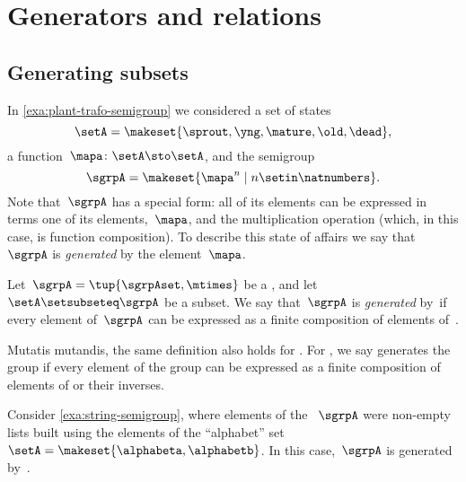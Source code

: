 
\section{Generators and relations}


\subsection{Generating subsets}

In \cref{exa:plant-trafo-semigroup} we considered a set of states
%
\begin{equation}
    \setA= \makeset{ \sprout, \yng, \mature, \old, \dead },
\end{equation}
%
a function~$\mapa \colon \setA \sto \setA$, and the semigroup
%
\begin{equation}
    \label{eq:trafo-sgrp-one-gen}
    \sgrpA = \makeset{ \mapa^n \mid n \setin \natnumbers }.
\end{equation}
%
Note that~$\sgrpA$ has a special form: all of its elements can be expressed in terms one of its elements,~$\mapa$, and the multiplication operation (which, in this case, is function composition).
To describe this state of affairs we say that~$\sgrpA$ is \emph{generated} by the element~$\mapa$.

\begin{ctdefinition}
    \label{def:gen-semigrp}
    Let~$\sgrpA = \tup{\sgrpAset, \mtimes}$ be a  , and let~$\setA \setsubseteq \sgrpA$ be a subset.
    We say that~$\sgrpA$ is \emph{generated} by~\setA if every element of~$\sgrpA$ can be expressed as a finite composition of elements of~\setA.
\end{ctdefinition}

\begin{remark}
    Mutatis mutandis, the same definition also holds for .
    For , we say \setA generates the group if every element of the group can be expressed as a finite composition of elements of \setA or their inverses.
\end{remark}

\begin{example}
    Consider \cref{exa:string-semigroup}, where elements of the ~$\sgrpA$ were non-empty lists built using the elements of the ``alphabet'' set~$\setA = \makeset{ \alphabeta, \alphabetb}$.
    In this case,~$\sgrpA$ is generated by~\setA.
\end{example}

